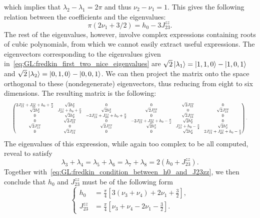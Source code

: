 which implies that $\lambda_2-\lambda_1= 2\pi$ and thus $\nu_2-\nu_1=1$.
This gives the following relation between the coefficients and the eigenvalues:
\begin{equation}
    \pi(2\nu_1 + 3/2) = h_0 - 3 J_{23}^{zz}.
    \label{eq:GL:fredkin_condition_between_h0_and_J23zz}
\end{equation}
The rest of the eigenvalues, however, involve complex expressions containing roots of cubic polynomials, from which we cannot easily extract useful expressions.
The eigenvectors corresponding to the eigenvalues given in~\cref{eq:GL:fredkin_first_two_nice_eigenvalues} are
$\sqrt2\ket{\lambda_1} = \ket{1,1,0} - \ket{1,0,1}$
and
$\sqrt2\ket{\lambda_2} = \ket{0,1,0} - \ket{0,0,1}$.
We can then project the matrix onto the space orthogonal to these (nondegenerate) eigenvectors, thus reducing from eight to six dimensions. The resulting matrix is the following:
\begin{equation}\scalebox{0.6}{$%
\begin{pmatrix}
	2 J_{13}^{zz} + J_{23}^{zz} + h_{0} + \frac{\pi }{2} & \sqrt{2} h_{2}^{x} & 0 & 0 & \sqrt{2} J_{13}^{xx} & 0 \\
	\sqrt{2} h_{2}^{x} & J_{23}^{zz} + h_{0} + \frac{\pi }{2} & \sqrt{2} h_{2}^{x} & \sqrt{2} J_{13}^{xx} & 0 & \sqrt{2} J_{13}^{xx} \\
	0 & \sqrt{2} h_{2}^{x} & -2 J_{13}^{zz} + J_{23}^{zz} + h_{0} + \frac{\pi }{2} & 0 & \sqrt{2} J_{13}^{xx} & 0 \\
	0 & \sqrt{2} J_{13}^{xx} & 0 & -2 J_{13}^{zz} + J_{23}^{zz} + h_{0}-\frac{\pi }{2} & \sqrt{2} h_{2}^{x} & 0 \\
	\sqrt{2} J_{13}^{xx} & 0 & \sqrt{2} J_{13}^{xx} & \sqrt{2} h_{2}^{x} & J_{23}^{zz} + h_{0}-\frac{\pi }{2} & \sqrt{2} h_{2}^{x} \\
	0 & \sqrt{2} J_{13}^{xx} & 0 & 0 & \sqrt{2} h_{2}^{x} & 2 J_{13}^{zz} + J_{23}^{zz} + h_{0}-\frac{\pi }{2} \\
\end{pmatrix}.$}
\end{equation}
The eigenvalues of this expression, while again too complex to be all computed, reveal to satisfy
\begin{equation}
    \lambda_3 + \lambda_4
    = \lambda_5 + \lambda_6
    = \lambda_7 + \lambda_8 = 2(h_0 + J_{23}^{zz}).
\end{equation}
Together with~\cref{eq:GL:fredkin_condition_between_h0_and_J23zz}, we then conclude that $h_0$ and $J_{23}^{zz}$ must be of the following form
\begin{equation}
\begin{cases}
    h_0 &= \frac{\pi}{4}\left[3(\nu_3+\nu_4) + 2\nu_1+\frac{3}{2}\right], \\
    J_{23}^{zz} &= \frac{\pi}{4}\left[\nu_3+\nu_4 - 2\nu_1-\frac{3}{2}\right].
\end{cases}
\label{eq:GL:fredkin_sols_h0_and_J23zz_vs_nus}
\end{equation}

